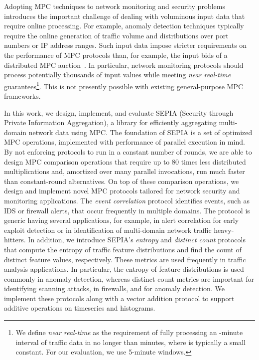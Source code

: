 \documentclass[letterpaper,11pt,onecolumn,titlepage]{article}
\begin{document}
Adopting MPC techniques to network monitoring and security problems
introduces the important challenge of dealing with voluminous input
data that require online processing. For example, anomaly detection
techniques typically require the online generation of traffic volume
and distributions over port numbers or IP address ranges. Such input
data impose stricter requirements on the performance of MPC protocols
than, for example, the input bids of a distributed MPC
auction~\cite{bogetoft2009secure}.  In particular, network monitoring
protocols should process potentially thousands of input values while
meeting {\it near real-time} guarantees\footnote{We define {\it near
real-time} as the requirement of fully processing an -minute
interval of traffic data in no longer than  minutes, where  is typically
a small constant. For our evaluation, we use 5-minute windows.}. This is not
presently possible with existing general-purpose MPC frameworks.

In this work, we design, implement, and evaluate SEPIA (Security
through Private Information Aggregation), a library for
efficiently aggregating multi-domain network data using MPC. 
The foundation of SEPIA is a set of optimized MPC operations, implemented
with performance of parallel execution in mind.
By not enforcing protocols to run in a constant number of rounds, 
we are able to design MPC comparison operations that require up to 80 times
less distributed multiplications and, amortized over many parallel invocations, 
run much faster than constant-round alternatives. 
On top of these comparison operations, we
design and implement novel MPC protocols tailored for network
security and monitoring applications. The {\it event correlation}
protocol identifies events, such as IDS or firewall alerts, that occur
frequently in multiple domains.  The protocol is generic having
several applications, for example, in alert correlation for early
exploit detection or in identification of multi-domain network traffic
heavy-hitters. In addition, we introduce SEPIA's {\it entropy} and
{\it distinct count} protocols that compute the entropy of traffic
feature distributions and find the count of distinct feature values,
respectively. These metrics are used frequently in traffic analysis
applications.  In particular, the entropy of feature distributions is
used commonly in anomaly detection, whereas distinct count metrics are
important for identifying scanning attacks, in firewalls, and for
anomaly detection. We implement these protocols along with a
vector addition protocol to support additive
operations on timeseries and histograms.
\end{document}
